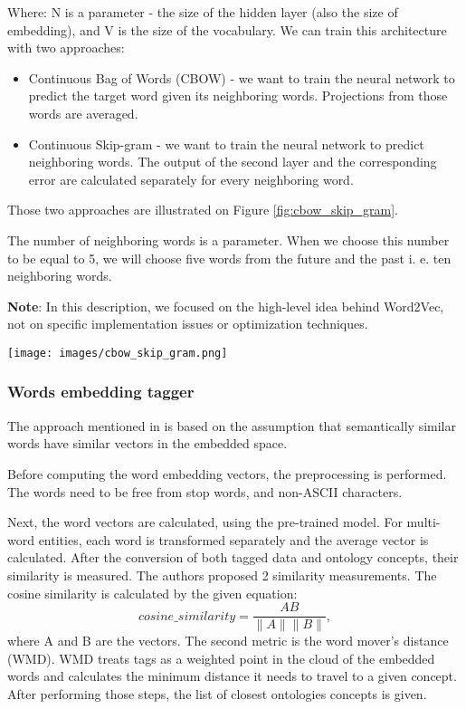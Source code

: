 \documentclass[11pt]{article}
\begin{document}
Where: N is a parameter - the size of the hidden layer (also the size of embedding), and V is the size of the vocabulary. 
We can train this architecture with two approaches: 
\begin{itemize}
    \item  Continuous Bag of Words (CBOW) - we want to train the neural network to predict the target word given its neighboring words. Projections from those words are averaged. 
    \item  Continuous Skip-gram - we want to train the neural network to predict neighboring words. The output of the second layer and the corresponding error are calculated separately for every neighboring word.
\end{itemize}

Those two approaches are illustrated on Figure \ref{fig:cbow_skip_gram}.

The number of neighboring words is a parameter. When we choose this number to be equal to 5, we will choose five words from the future and the past i. e. ten neighboring words. 

\textbf{Note}: In this description, we focused on the high-level idea behind Word2Vec, not on specific implementation issues or optimization techniques.

\begin{figure*}[!h]
\texttt{[image: images/cbow\_skip\_gram.png]}
 \caption{Illustration of CBOW and Skip-gram models \cite{Word2vec}.}
 \label{fig:cbow_skip_gram}
 \centering
\end{figure*}


\subsubsection{Words embedding tagger}
The approach mentioned in \cite{Karadeniz2019}  is based on the assumption that semantically similar words have similar vectors in the embedded space. 

Before computing the word embedding vectors, the preprocessing is performed. The words need to be free from stop words, and non-ASCII characters. 

Next, the word vectors are calculated, using the pre-trained model. For multi-word entities, each word is transformed separately and the average vector is calculated. After the conversion of both tagged data and ontology concepts, their similarity is measured. The authors proposed 2 similarity measurements. The cosine similarity is calculated by the given equation:
\begin{equation}
    cosine\_similarity = \frac{A B}{\parallel A \parallel \parallel B \parallel},
\end{equation}
where A and B are the vectors. 
The second metric is the word mover's distance (WMD). WMD treats tags as a weighted point in the cloud of the embedded words and calculates the minimum distance it needs to travel to a given concept.
 After performing those steps, the list of closest ontologies concepts is given. 
\end{document}
